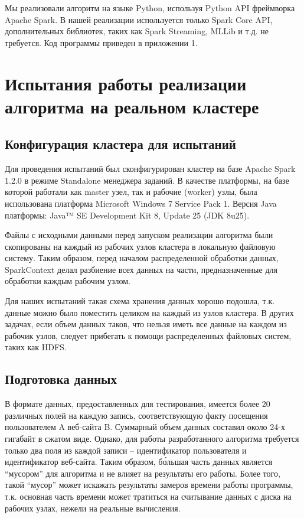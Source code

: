 \documentclass[12pt,a4paper]{report}
\begin{document}
Мы реализовали алгоритм на языке Python, используя Python API фреймворка Apache Spark. В нашей реализации используется только Spark Core API, дополнительных библиотек, таких как Spark Streaming, MLLib и т.д. не требуется. Код программы приведен в приложении 1.

\newpage

\section{Испытания работы реализации алгоритма на реальном кластере}

\subsection{Конфигурация кластера для испытаний}
Для проведения испытаний был сконфигурирован кластер на базе Apache Spark 1.2.0 в режиме Standalone менеджера заданий. В качестве платформы, на базе которой работали как master узел, так и рабочие (worker) узлы, была использована платформа Microsoft Windows 7 Service Pack 1. Версия Java платформы: Java™ SE Development Kit 8, Update 25 (JDK 8u25).

Файлы с исходными данными перед запуском реализации алгоритма были скопированы на каждый из рабочих узлов кластера в локальную файловую систему. Таким образом, перед началом распределенной обработки данных, SparkContext делал разбиение всех данных на части, предназначенные для обработки каждым рабочим узлом.

Для наших испытаний такая схема хранения данных хорошо подошла, т.к. данные можно было поместить целиком на каждый из узлов кластера. В других задачах, если объем данных таков, что нельзя иметь все данные на каждом из рабочик узлов, следует прибегать к помощи распределенных файловых систем, таких как HDFS.

\subsection{Подготовка данных}
В формате данных, предоставленных для тестирования, имеется более 20 различных полей на каждую запись, соответствующую факту посещения пользователем A веб-сайта B. Суммарный объем данных составил около 24-х гигабайт в сжатом виде. Однако, для работы разработанного алгоритма требуется только два поля из каждой записи -- идентификатор пользователя и идентификатор веб-сайта. Таким образом, б\'{о}льшая часть данных является ``мусором'' для алгоритма и не влияет на результаты его работы. Более того, такой ``мусор'' может искажать результаты замеров времени работы программы, т.к. основная часть времени может тратиться на считывание данных с диска на рабочих узлах, нежели на реальные вычисления.
\end{document}
